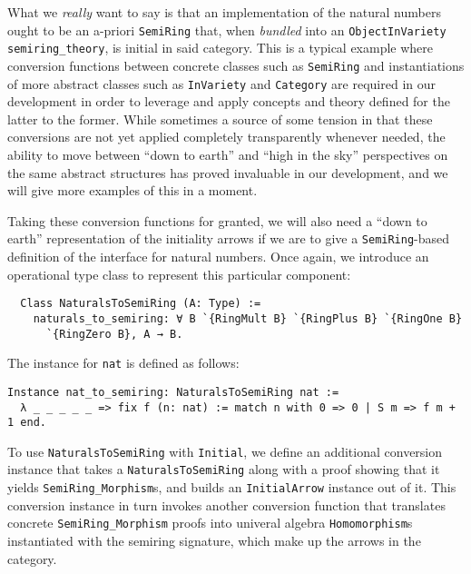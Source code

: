 \documentclass[a4paper,10pt,runningheads]{llncs}
\begin{document}
What we \emph{really} want to say is that an implementation of the natural numbers ought to be an a-priori \lstinline|SemiRing| that, when \emph{bundled} into an \lstinline|ObjectInVariety semiring_theory|, is initial in said category. This is a typical example where conversion functions between concrete classes such as \lstinline|SemiRing| and instantiations of more abstract classes such as \lstinline|InVariety| and \lstinline|Category| are required in our development in order to leverage and apply concepts and theory defined for the latter to the former. While sometimes a source of some tension in that these conversions are not yet applied completely transparently whenever needed, the ability to move between ``down to earth'' and ``high in the sky'' perspectives on the same abstract structures has proved invaluable in our development, and we will give more examples of this in a moment.

Taking these conversion functions for granted, we will also need a ``down to earth'' representation of the initiality arrows if we are to give a \lstinline|SemiRing|-based definition of the interface for natural numbers. Once again, we introduce an operational type class to represent this particular component:
\begin{lstlisting}
  Class NaturalsToSemiRing (A: Type) :=
    naturals_to_semiring: ∀ B `{RingMult B} `{RingPlus B} `{RingOne B}
      `{RingZero B}, A → B.
\end{lstlisting}
The instance for \lstinline|nat| is defined as follows:
\begin{lstlisting}
Instance nat_to_semiring: NaturalsToSemiRing nat :=
  λ _ _ _ _ _ => fix f (n: nat) := match n with 0 => 0 | S m => f m + 1 end.
\end{lstlisting}

To use \lstinline|NaturalsToSemiRing| with \lstinline|Initial|, we define an additional conversion instance that takes a \lstinline|NaturalsToSemiRing| along with a proof showing that it yields \mbox{\lstinline|SemiRing_Morphism|s}, and builds an \lstinline|InitialArrow| instance out of it. This conversion instance in turn invokes another conversion function that translates concrete \lstinline|SemiRing_Morphism| proofs into univeral algebra \lstinline|Homomorphism|s instantiated with the semiring signature, which make up the arrows in the category.
\end{document}
